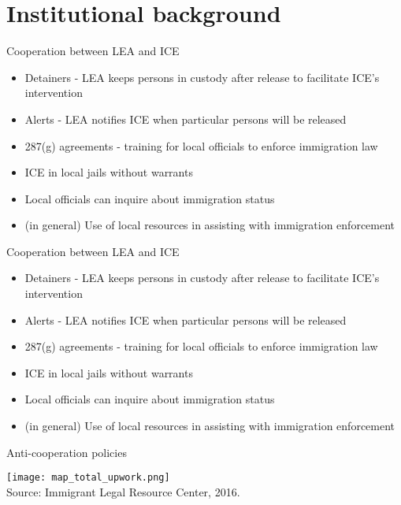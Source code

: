 \documentclass[xcolor=pdftex,dvipsnames,table]{beamer}
\begin{document}
\section{Institutional background}
\begin{frame}{Cooperation between LEA and ICE}
\begin{itemize}
\item Detainers - LEA keeps persons in custody after release to facilitate ICE's intervention
\item Alerts - LEA notifies ICE when particular persons will be released
\item 287(g) agreements - training for local officials to enforce immigration law
\item ICE in local jails without warrants
\item Local officials can inquire about immigration status
\item (in general) Use of local resources in assisting with immigration enforcement
\end{itemize}
\end{frame}

\begin{frame}{Cooperation between LEA and ICE}
\begin{itemize}
\item Detainers - LEA keeps persons in custody after release to facilitate ICE's intervention
\item Alerts - LEA notifies ICE when particular persons will be released
\item 287(g) agreements - training for local officials to enforce immigration law
\item ICE in local jails without warrants
\item Local officials can inquire about immigration status
\item (in general) Use of local resources in assisting with immigration enforcement
\end{itemize}
\end{frame}

\begin{frame}{Anti-cooperation policies}
\begin{center}
\texttt{[image: map\_total\_upwork.png]}
\\\tiny{Source: Immigrant Legal Resource Center, 2016.}
\end{center}
\end{frame}
\end{document}
